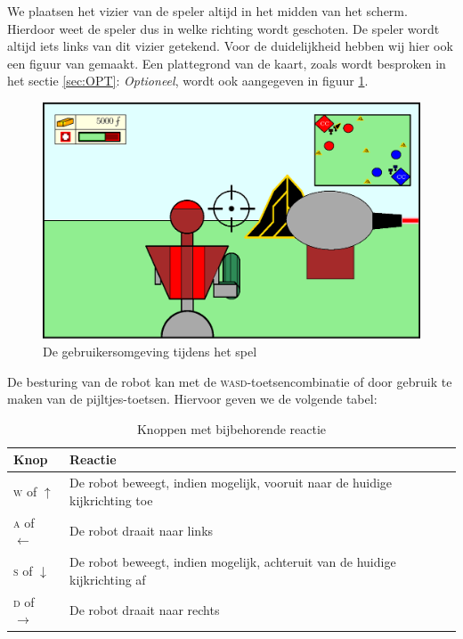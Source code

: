 We plaatsen het vizier van de speler altijd in het midden van het scherm. Hierdoor weet de speler dus in welke richting wordt geschoten. De speler wordt altijd iets links van dit vizier getekend. Voor de duidelijkheid hebben wij hier ook een figuur van gemaakt. Een plattegrond van de kaart, zoals wordt besproken in het sectie \ref{sec:OPT}: \emph{Optioneel}, wordt ook aangegeven in figuur \ref{fig:UI}.
\begin{figure}[H]
\includegraphics[width=\textwidth]{Graphics/UI.eps}
\caption{De gebruikersomgeving tijdens het spel}
\label{fig:UI}
\end{figure}
De besturing van de robot kan met de \textsc{wasd}-toetsencombinatie of door gebruik te maken van de pijltjes-toetsen. Hiervoor geven we de volgende tabel:
\begin{table}[H]
        \small
        \centering
        \begin{tabular}{| l | l |}
        \hline
        Knop & Reactie \\ \hline
        \textsc{w} of $\uparrow$ & De robot beweegt, indien mogelijk, vooruit naar de huidige kijkrichting toe \\ \hline
        \textsc{a} of $\leftarrow$ & De robot draait naar links \\ \hline
        \textsc{s} of $\downarrow$ & De robot beweegt, indien mogelijk, achteruit van de huidige kijkrichting af \\ \hline
        \textsc{d} of $\rightarrow$ & De robot draait naar rechts \\ \hline
        \end{tabular}
        \caption{Knoppen met bijbehorende reactie}
        \label{tab:planning}
    \end{table}

